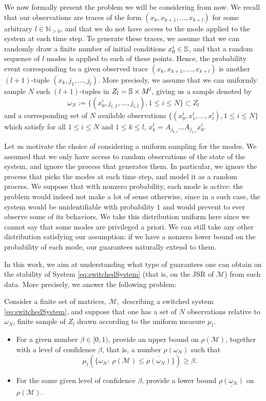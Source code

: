 We now formally present the problem we will be considering from now. We recall that our observations are traces of the form $(x_k,x_{k+1},\dots,x_{k+l})$ for some arbitrary $l \in \mathbb{N}_{>0}$, and that we do not have access to the mode applied to the system at each time step. To generate these traces, we assume that we can randomly draw a finite number of initial conditions $x_0^i \in \mathbb{S}$, and that a random sequence of $l$ modes is applied to each of these points. Hence, the probability event corresponding to a given observed trace $(x_k,x_{k+1},\dots,x_{k+l})$ is another $(l+1)$-tuple $(x_k,j_1,\dots,j_l)$. More precisely, we assume that we can uniformly sample $N$ such $(l+1)$-tuples in $Z_l = \mathbb{S} \times M^l$, giving us a sample denoted by 
\begin{equation*}
\omega_N := \{(x_0^i, j_{i,1}, \dots, j_{i,l}), 1 \leq i \leq N \}  \subset Z_l
\end{equation*}
and a corresponding set of $N$ available observations $\{(x_0^i,x_1^i, \dots, x_l^i), 1\leq i\leq N \}$ which satisfy for all $1 \leq i \leq N$ and $1 \leq k \leq l$, $x_k^i= A_{j_{k,i}} \dots A_{j_{1,i}} x_0^i$.
\begin{rem}\label{rem:probGeneralize}
Let us motivate the choice of considering a uniform sampling for the modes. We assumed that we only have access to random observations of the state of the system, and ignore the process that generates them. In particular, we ignore the process that picks the modes at each time step, and model it as a random process. We suppose that with nonzero probability, each mode is active: the problem would indeed not make a lot of sense otherwise, since in a such case, the system would be unidentifiable with probability $1$ and would prevent to ever observe some of its behaviors. We take this distribution uniform here since we cannot say that some modes are privileged a priori. We can still take any other distribution satisfying our assumption: if we have a nonzero lower bound on the probability of each mode, our guarantees naturally extend to them.
\end{rem}
In this work, we aim at understanding what type of guarantees one can obtain on the stability of System \eqref{eq:switchedSystem} (that is, on the JSR of $\mathcal{M}$) from such data. More precisely, we answer the following problem:
\begin{prob}\label{problem} 
Consider a finite set of matrices, $\mathcal{M},$ describing a switched system \eqref{eq:switchedSystem}, and suppose that one has a set of $N$ observations relative to $\omega_N$, finite sample of $Z_l$ drawn according to the uniform measure $\mu_l$.
\begin{itemize}
\item For a given number $\beta \in [0,1)$, provide an upper bound on $\rho(\mathcal{M})$, together with a level of confidence $\beta$, that is, a number $\overline{\rho(\omega_N)}$ such that $$\mu_l \left( \{\omega_N: \ \rho(\mathcal{M}) \leq \overline{\rho(\omega_N)} \} \right) \geq \beta.$$
\item For the same given level of confidence $\beta$, provide a lower bound $\underline{\rho(\omega_N)}$ on $\rho(\mathcal{M})$.
\end{itemize}
\end{prob}

